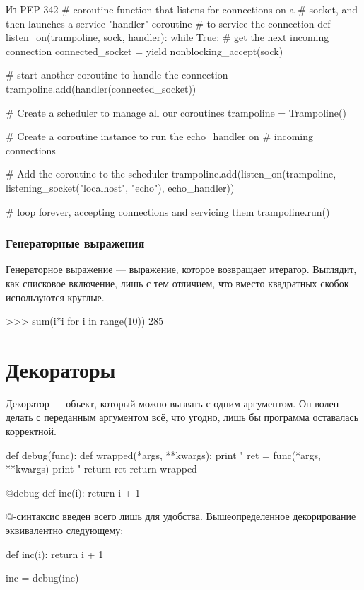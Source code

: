 \begin{pylst}{Из PEP 342}{}
# coroutine function that listens for connections on a
# socket, and then launches a service "handler" coroutine
# to service the connection
def listen_on(trampoline, sock, handler):
    while True:
        # get the next incoming connection
        connected_socket = yield nonblocking_accept(sock)

        # start another coroutine to handle the connection
        trampoline.add(handler(connected_socket))

# Create a scheduler to manage all our coroutines
trampoline = Trampoline()

# Create a coroutine instance to run the echo_handler on
# incoming connections

# Add the coroutine to the scheduler
trampoline.add(listen_on(trampoline,
                         listening_socket("localhost", "echo"),
                         echo_handler))

# loop forever, accepting connections and servicing them
trampoline.run()
\end{pylst}

\subsubsection{Генераторные выражения}
Генераторное выражение --- выражение, которое возвращает итератор. Выглядит, как списковое включение, лишь с тем отличием, что вместо квадратных скобок используются круглые.
\begin{pylst}{}{}
>>> sum(i*i for i in range(10))
285
\end{pylst}

\section{Декораторы}
\label{sec:py-decorators}
Декоратор --- объект, который можно вызвать с одним аргументом. Он волен делать с переданным аргументом всё, что угодно, лишь бы программа оставалась корректной.
\begin{pylst}{}{}
def debug(func):
    def wrapped(*args, **kwargs):
        print "%
        ret = func(*args, **kwargs)
        print "%
        return ret
    return wrapped

@debug
def inc(i):
    return i + 1
\end{pylst}

@-синтаксис введен всего лишь для удобства. Вышеопределенное декорирование эквивалентно следующему:
\begin{pylst}{}{}
def inc(i):
    return i + 1

inc = debug(inc)
\end{pylst}

